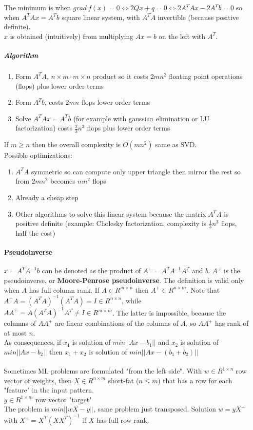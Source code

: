 \documentclass[10pt]{report}
\begin{document}
The minimum is when $grad\:f(x) = 0 \Leftrightarrow 2Qx + q = 0 \Leftrightarrow 2A^TAx - 2A^Tb = 0$ so when $A^TAx = A^Tb$ square linear system, with $A^TA$ invertible (because positive definite).\\
$x$ is obtained (intuitively) from multiplying $Ax=b$ on the left with $A^T$.
\subparagraph{Algorithm}
\begin{enumerate}
	\item Form $A^TA$, $n\times m\cdot m\times n$ product so it costs $2mn^2$ floating point operations (flops) plus lower order terms
	\item Form $A^Tb$, costs $2mn$ flops lower order terms
	\item Solve $A^TAx = A^Tb$ (for example with gaussian elimination or LU factorization) costs $\frac{2}{3}n^3$ flops plus lower order terms
\end{enumerate}
If $m \geq n$ then the overall complexity is $O(mn^2)$ same as SVD.\\
Possible optimizations:
\begin{enumerate}
	\item $A^TA$ symmetric so can compute only upper triangle then mirror the rest so from $2mn^2$ becomes $mn^2$ flops
	\item Already a cheap step
	\item Other algorithms to solve this linear system because the matrix $A^TA$ is positive definite (example: Cholesky factorization, complexity is $\frac{1}{3}n^3$ flops, half the cost)
\end{enumerate}
\paragraph{Pseudoinverse} $x = A^TA^{-1}b$ can be denoted as the product of $A^+ = A^TA^{-1}A^T$ and $b$. $A^+$ is the pseudoinverse, or \textbf{Moore-Penrose pseudoinverse}. The definition is valid only when $A$ has full column rank. If $A\in R^{m\times n}$ then $A^+ \in R^{n\times m}$. Note that $A^+A = (A^TA)^{-1}(A^TA) = I\in R^{n\times n}$, while $AA^+ = A(A^TA)^{-1}A^T \neq I\in R^{m\times m}$. The latter is impossible, because the columns of $AA^+$ are linear combinations of the columns of $A$, so $AA^+$ has rank of at most $n$.\\
As consequences, if $x_1$ is solution of $min||Ax - b_1||$ and $x_2$ is solution of $min||Ax - b_2||$ then $x_1+x_2$ is solution of $min||Ax - (b_1 + b_2)||$\\\\Sometimes ML problems are formulated "from the left side". With $w\in R^{1\times n}$ row vector of weights, then $X\in R^{n\times m}$ short-fat ($n\leq m$) that has a row for each "feature" in the input pattern.\\
$y \in R^{1\times m}$ row vector "target"\\
The problem is $min||wX - y||$, same problem just transposed. Solution $w = yX^+$ with $X^+ = X^T(XX^T)^{-1}$ if $X$ has full row rank.
\end{document}
